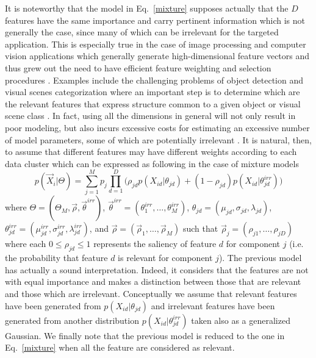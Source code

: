 \documentclass[journal,10pt]{elsart}
\begin{document}
It is noteworthy that the model in Eq.~\ref{mixture} supposes actually that the $D$ features have the same importance and carry pertinent information which is not generally the case, since many of which can be irrelevant for the targeted application. This is especially true in the case of image processing and computer vision applications which generally generate high-dimensional feature vectors and thus grew out the need to have efficient feature weighting and selection procedures \cite{Tsotsos1995,Vidal2003,Zhang2006,Bosch2007,Laptev2009}. Examples include the challenging problems of object detection and visual scenes categorization where an important step is to determine which are the relevant features that express structure common to a given object or visual scene class \cite{Papageorgiou1998,Levi2004}. In fact, using all the dimensions in general will not only result in poor modeling, but also incurs excessive costs for estimating an excessive number of model parameters, some of which are potentially irrelevant \cite{Wei2007}. It is natural, then, to assume that different features may have different weights according to each data cluster \cite{Baggenstoss1999,Baggenstoss2000} which can be expressed as following in the case of mixture models \cite{Li2009}
\begin{equation}\label{mixtureapproximated}
p(\vec{X}_i|\Theta)=\sum_{j=1}^Mp_j \prod_{d=1}^D \big(\rho_{jd} p(X_{id}|\theta_{jd})+(1-\rho_{jd}) p(X_{id}|\theta^{irr}_{jd})\big)
\end{equation}
where $\Theta=(\Theta_M,\vec{\rho},\vec{\theta}^{irr})$, $\vec{\theta}^{irr}=(\theta^{irr}_1,\ldots,\theta^{irr}_M)$, $\theta_{jd}=(\mu_{jd},\sigma_{jd},\lambda_{jd})$, $\theta_{jd}^{irr}=(\mu_{jd}^{irr},\sigma_{jd}^{irr},\lambda_{jd}^{irr})$, and $\vec{\rho}=(\vec{\rho}_1,\ldots,\vec{\rho}_M)$ such that $\vec{\rho}_j=(\rho_{j1},\ldots,\rho_{jD})$ where each $0 \leq \rho_{jd} \leq 1$ represents the saliency of feature $d$ for component $j$ (i.e. the probability that feature $d$ is relevant for component $j$). The previous model has actually a sound interpretation. Indeed, it considers that the features are not with equal importance and makes a distinction between those that are relevant and those which are irrelevant. Conceptually we assume that relevant features have been generated from $p(X_{id}|\theta_{jd})$ and irrelevant features have been generated from another distribution $p(X_{id}|\theta^{irr}_{jd})$  taken also as a generalized Gaussian. We finally note that the previous model is reduced to the one in Eq.~\ref{mixture} when all the feature are considered as relevant.
\end{document}
